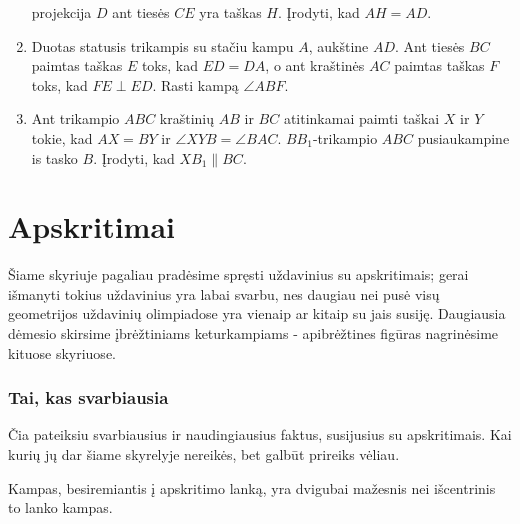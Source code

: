 \begin{enumerate}
  projekcija $D$ ant tiesės $CE$ yra taškas $H$. Įrodyti, kad $AH = AD$.
\item Duotas statusis trikampis su stačiu kampu $A$, aukštine $AD$. Ant
  tiesės $BC$ paimtas taškas $E$ toks, kad $ED = DA$, o ant kraštinės $AC$
  paimtas taškas $F$ toks, kad $FE \perp{ED}$. Rasti kampą $\angle ABF$.
\item Ant trikampio $ABC$ kraštinių $AB$  ir $BC$ atitinkamai paimti taškai
  $X$ ir $Y$ tokie, kad $AX=BY$ ir $\angle XYB = \angle BAC$.
  $BB_1$-trikampio $ABC$ pusiaukampine is tasko $B$. Įrodyti, kad $XB_1
  \parallel{BC}$.
\end{enumerate}

\newpage 
\section{Apskritimai}

Šiame skyriuje pagaliau pradėsime spręsti uždavinius su apskritimais; gerai
išmanyti tokius uždavinius yra labai svarbu, nes daugiau nei pusė visų
geometrijos uždavinių olimpiadose yra vienaip ar kitaip su jais susiję.
Daugiausia dėmesio skirsime įbrėžtiniams keturkampiams - apibrėžtines
figūras nagrinėsime kituose skyriuose.  

\subsubsection{Tai, kas svarbiausia}
Čia pateiksiu svarbiausius ir naudingiausius faktus, susijusius su
apskritimais. Kai kurių jų dar šiame skyrelyje nereikės, bet galbūt
prireiks vėliau.

\begin{teig} 
  Kampas, besiremiantis į apskritimo lanką, yra dvigubai mažesnis nei
  išcentrinis to lanko kampas. 
\end{teig}

